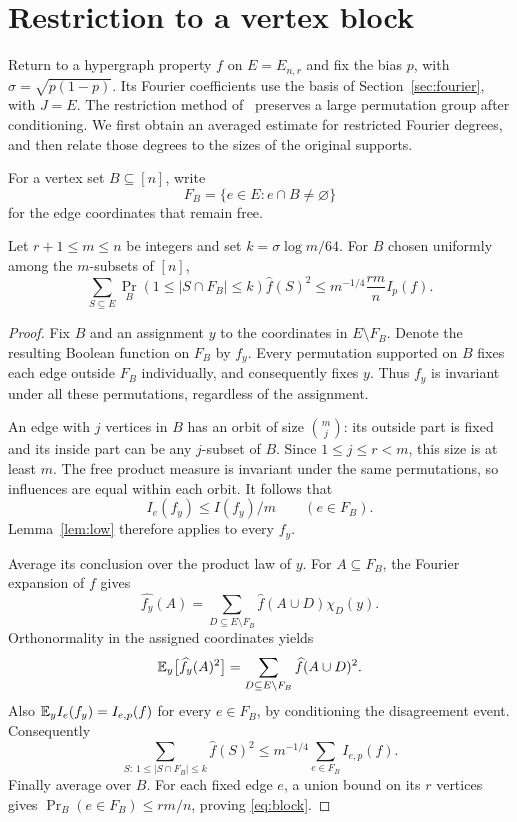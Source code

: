\section{Restriction to a vertex block}
\label{sec:restriction}

Return to a hypergraph property $f$ on $E=E_{n,r}$ and fix the bias
$p$, with $\sigma=\sqrt{p(1-p)}$. Its Fourier coefficients use the basis of
Section~\ref{sec:fourier}, with $J=E$.
The restriction method of~\cite[Lemma~3.1 and Proposition~3.2]{Graph2026} preserves a
large permutation group after conditioning. We first obtain an
averaged estimate for restricted Fourier degrees, and then relate
those degrees to the sizes of the original supports.

For a vertex set $B\subseteq[n]$, write
\[
 F_B=\{e\in E:e\cap B\ne\varnothing\}
\]
for the edge coordinates that remain free.

\begin{lemma}\label{lem:block}
Let $r+1\le m\le n$ be integers and set $k=\sigma\log m/64$.
For $B$ chosen uniformly among the $m$-subsets of $[n]$,
\begin{equation}\label{eq:block}
 \sum_{S\subseteq E}
 \Pr_B(1\le|S\cap F_B|\le k)\widehat f(S)^2
 \le m^{-1/4}\frac{rm}{n}I_p(f).
\end{equation}
\end{lemma}

\begin{proof}
Fix $B$ and an assignment $y$ to the coordinates in $E\setminus F_B$.
Denote the resulting Boolean function on $F_B$ by $f_y$.
Every permutation supported on $B$ fixes each edge outside $F_B$
individually, and consequently fixes $y$. Thus $f_y$ is invariant
under all these permutations, regardless of the assignment.

An edge with $j$ vertices in $B$ has an orbit of size $\binom mj$:
its outside part is fixed and its inside part can be any $j$-subset
of $B$. Since $1\le j\le r<m$, this size is at least $m$.
The free product measure is invariant under the same permutations,
so influences are equal within each orbit. It follows that
\[
 I_e(f_y)\le I(f_y)/m\qquad(e\in F_B).
\]
Lemma~\ref{lem:low} therefore applies to every $f_y$.

Average its conclusion over the product law of $y$. For $A\subseteq F_B$,
the Fourier expansion of $f$ gives
\[
 \widehat{f_y}(A)=
 \sum_{D\subseteq E\setminus F_B}\widehat f(A\cup D)\chi_D(y).
\]
Orthonormality in the assigned coordinates yields
\[
 \mathbb E_y\bigl[\widehat{f_y}(A)^2\bigr]
 =\sum_{D\subseteq E\setminus F_B}\widehat f(A\cup D)^2.
\]
Also $\mathbb E_y I_e(f_y)=I_{e,p}(f)$ for every $e\in F_B$, by
conditioning the disagreement event. Consequently
\[
 \sum_{S:\,1\le|S\cap F_B|\le k}\widehat f(S)^2
 \le m^{-1/4}\sum_{e\in F_B}I_{e,p}(f).
\]
Finally average over $B$. For each fixed edge $e$, a union bound on
its $r$ vertices gives $\Pr_B(e\in F_B)\le rm/n$, proving
\eqref{eq:block}.
\end{proof}

